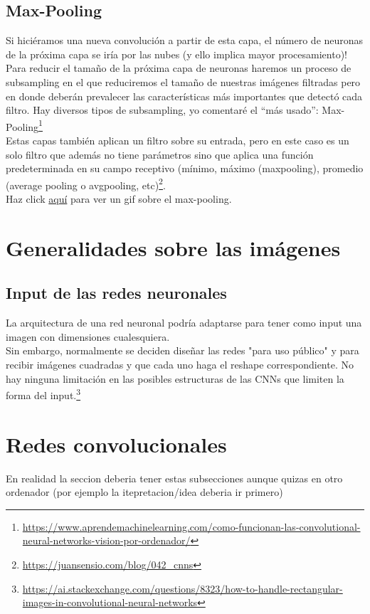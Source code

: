\documentclass{article}
\begin{document}
\subsection{Max-Pooling}
Si hiciéramos una nueva convolución a partir de esta capa, el número de neuronas de la próxima capa se iría por las nubes (y ello implica mayor procesamiento)! Para reducir el tamaño de la próxima capa de neuronas haremos un proceso de subsampling en el que reduciremos el tamaño de nuestras imágenes filtradas pero en donde deberán prevalecer las características más importantes que detectó cada filtro. Hay diversos tipos de subsampling, yo comentaré el “más usado”: Max-Pooling\footnote{\url{https://www.aprendemachinelearning.com/como-funcionan-las-convolutional-neural-networks-vision-por-ordenador/}}\\

Estas capas también aplican un filtro sobre su entrada, pero en este caso es un solo filtro que además no tiene parámetros sino que aplica una función predeterminada en su campo receptivo (mínimo, máximo (maxpooling), promedio (average pooling o avgpooling, etc)\footnote{\url{https://juansensio.com/blog/042_cnns}}.\\

Haz click \href{https://miro.medium.com/max/1456/1*WvHC5bKyrHa7Wm3ca-pXtg.gif}{aquí} para ver un gif sobre el  max-pooling.

\section{Generalidades sobre las imágenes}
\subsection{Input de las redes neuronales}

La arquitectura de una red neuronal podría adaptarse para tener como input una imagen con dimensiones cualesquiera.\\

Sin embargo, normalmente se deciden diseñar las redes "para uso público" y para recibir imágenes cuadradas y que cada uno haga el reshape correspondiente. No hay ninguna limitación en las posibles estructuras de las CNNs que limiten la forma del input.\footnote{\url{https://ai.stackexchange.com/questions/8323/how-to-handle-rectangular-images-in-convolutional-neural-networks}}

\section{Redes convolucionales}
En realidad la seccion deberia tener estas subsecciones aunque quizas en otro ordenador (por ejemplo la itepretacion/idea deberia ir primero)
\end{document}
